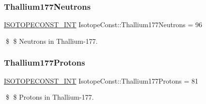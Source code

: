 \subsubsection{\texorpdfstring{Thallium177\+Neutrons}{Thallium177Neutrons}}
{\footnotesize\ttfamily \mbox{\hyperlink{group___isotope_const-_macros_ga5f18360b3e99483a35c32d789e62621c}{I\+S\+O\+T\+O\+P\+E\+C\+O\+N\+S\+T\+\_\+\+I\+NT}} Isotope\+Const\+::\+Thallium177\+Neutrons = 96}

\$ \$ Neutrons in Thallium-\/177. \mbox{\label{group___isotope_const-_thallium-_tl177_ga3e16750b69dc3134f2a31a4c5af2c696}} 
\subsubsection{\texorpdfstring{Thallium177\+Protons}{Thallium177Protons}}
{\footnotesize\ttfamily \mbox{\hyperlink{group___isotope_const-_macros_ga5f18360b3e99483a35c32d789e62621c}{I\+S\+O\+T\+O\+P\+E\+C\+O\+N\+S\+T\+\_\+\+I\+NT}} Isotope\+Const\+::\+Thallium177\+Protons = 81}

\$ \$ Protons in Thallium-\/177. 